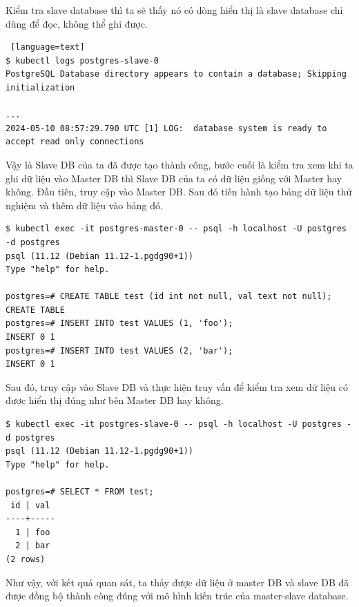 \noindent Kiểm tra slave database thì ta sẽ thấy nó có dòng hiển thị là slave database chỉ dùng để đọc, không thể ghi được.
\begin{lstlisting} [language=text]
$ kubectl logs postgres-slave-0
PostgreSQL Database directory appears to contain a database; Skipping initialization

...
2024-05-10 08:57:29.790 UTC [1] LOG:  database system is ready to accept read only connections
\end{lstlisting}
\noindent Vậy là Slave DB của ta đã được tạo thành công, bước cuối là kiểm tra xem khi ta ghi dữ liệu vào Master DB thì Slave DB của ta có dữ liệu giống với Master hay không. Đầu tiên, truy cập vào Master DB.
Sau đó tiến hành tạo bảng dữ liệu thử nghiệm và thêm dữ liệu vào bảng đó.
\begin{lstlisting}[language=text]
$ kubectl exec -it postgres-master-0 -- psql -h localhost -U postgres -d postgres
psql (11.12 (Debian 11.12-1.pgdg90+1))
Type "help" for help.

postgres=# CREATE TABLE test (id int not null, val text not null);
CREATE TABLE
postgres=# INSERT INTO test VALUES (1, 'foo');
INSERT 0 1
postgres=# INSERT INTO test VALUES (2, 'bar');
INSERT 0 1
\end{lstlisting}
\noindent Sau đó, truy cập vào Slave DB và thực hiện truy vấn để kiểm tra xem dữ liệu có được hiển thị đúng như bên Master DB hay không.
\begin{lstlisting}[language=text]
$ kubectl exec -it postgres-slave-0 -- psql -h localhost -U postgres -d postgres
psql (11.12 (Debian 11.12-1.pgdg90+1))
Type "help" for help.

postgres=# SELECT * FROM test;
 id | val
----+-----
  1 | foo
  2 | bar
(2 rows)
\end{lstlisting}
\noindent Như vậy, với kết quả quan sát, ta thấy được dữ liệu ở master DB và slave DB đã được đồng bộ thành công đúng với mô hình kiến trúc của master-slave database.

